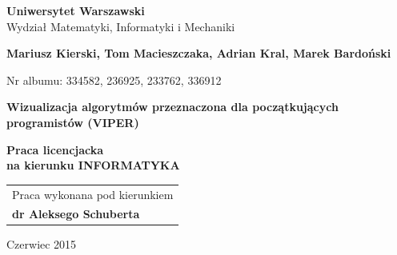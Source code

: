 \documentclass[a4paper,twoside,openright,11pt]{report}
\begin{document}
\begin{titlepage}%
    \let\footnotesize\small
    \let\footnoterule\relax
    \let \footnote \thanks
    \begin{center}%
      {\LARGE\textbf{Uniwersytet Warszawski}\\
        Wydzia\l{} Matematyki, Informatyki i Mechaniki\par}
      \vspace{1cm plus 1fill} 
      {\Large\bf Mariusz Kierski, Tom Macieszczaka, Adrian Kral, Marek Bardoński\par}
      \vspace{0.2cm}
      {\large Nr albumu: 334582, 236925, 233762, 336912\par}
      \vspace{8mm plus .1fill}
      {\Huge\textbf{Wizualizacja algorytmów przeznaczona dla początkujących programistów (VIPER)}\par}
      \vspace{8mm plus .1fill}
      {\large\bf Praca licencjacka\\[3pt]
        na kierunku \MakeUppercase{Informatyka} \\}
      \vspace{2cm plus 1.5fill}
      \begin{flushright}\large
        \begin{tabular}{l}
          Praca wykonana pod kierunkiem\\
          \bfseries dr Aleksego Schuberta
        \end{tabular}
      \end{flushright}
      \vspace{1cm plus 1fill}
      {\large Czerwiec 2015}
    \end{center}
  \end{titlepage}%
\end{document}
